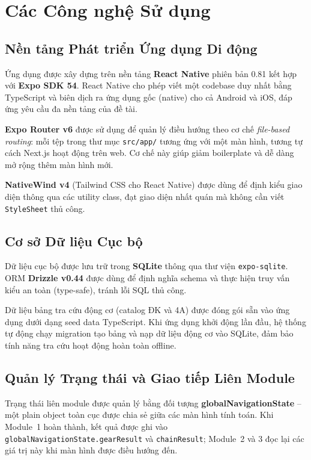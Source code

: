 \section{Các Công nghệ Sử dụng}
\label{sec:overview-tech}

\subsection{Nền tảng Phát triển Ứng dụng Di động}

Ứng dụng được xây dựng trên nền tảng \textbf{React Native} phiên bản 0.81 kết hợp với \textbf{Expo SDK 54}.
React Native cho phép viết một codebase duy nhất bằng TypeScript và biên dịch ra ứng dụng gốc (native)
cho cả Android và iOS, đáp ứng yêu cầu đa nền tảng của đề tài.

\textbf{Expo Router v6} được sử dụng để quản lý điều hướng theo cơ chế \textit{file-based routing}:
mỗi tệp trong thư mục \texttt{src/app/} tương ứng với một màn hình,
tương tự cách Next.js hoạt động trên web.
Cơ chế này giúp giảm boilerplate và dễ dàng mở rộng thêm màn hình mới.

\textbf{NativeWind v4} (Tailwind CSS cho React Native) được dùng để định kiểu giao diện
thông qua các utility class, đạt giao diện nhất quán mà không cần viết \texttt{StyleSheet} thủ công.

\subsection{Cơ sở Dữ liệu Cục bộ}

Dữ liệu cục bộ được lưu trữ trong \textbf{SQLite} thông qua thư viện \texttt{expo-sqlite}.
ORM \textbf{Drizzle v0.44} được dùng để định nghĩa schema và thực hiện truy vấn kiểu an toàn
(type-safe), tránh lỗi SQL thủ công.

Dữ liệu bảng tra cứu động cơ (catalog ĐK và 4A) được đóng gói sẵn vào ứng dụng
dưới dạng seed data TypeScript.
Khi ứng dụng khởi động lần đầu, hệ thống tự động chạy migration tạo bảng
và nạp dữ liệu động cơ vào SQLite, đảm bảo tính năng tra cứu hoạt động hoàn toàn offline.

\subsection{Quản lý Trạng thái và Giao tiếp Liên Module}

Trạng thái liên module được quản lý bằng đối tượng \textbf{globalNavigationState} --
một plain object toàn cục được chia sẻ giữa các màn hình tính toán.
Khi Module~1 hoàn thành, kết quả được ghi vào \texttt{globalNavigationState.gearResult}
và \texttt{chainResult}; Module~2 và 3 đọc lại các giá trị này khi màn hình được điều hướng đến.


